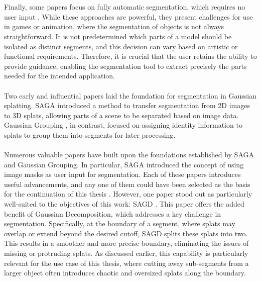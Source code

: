 \documentclass[12pt]{article}
\begin{document}
\\\\
Finally, some papers focus on fully automatic segmentation, which requires no user input \cite{automatic}. While these approaches are powerful, they present challenges for use in games or animation, where the segmentation of objects is not always straightforward. It is not predetermined which parts of a model should be isolated as distinct segments, and this decision can vary based on artistic or functional requirements. Therefore, it is crucial that the user retains the ability to provide guidance, enabling the segmentation tool to extract precisely the parts needed for the intended application.
\\\\
Two early and influential papers laid the foundation for segmentation in Gaussian splatting. SAGA \cite{saga} introduced a method to transfer segmentation from 2D images to 3D splats, allowing parts of a scene to be separated based on image data. Gaussian Grouping \cite{grouping}, in contrast, focused on assigning identity information to splats to group them into segments for later processing.
\\\\
Numerous valuable papers have built upon the foundations established by SAGA and Gaussian Grouping. In particular, SAGA introduced the concept of using image masks as user input for segmentation. Each of these papers introduces useful advancements, and any one of them could have been selected as the basis for the continuation of this thesis \cite{other1,other2,other3,other4}. However, one paper stood out as particularly well-suited to the objectives of this work: SAGD \cite{SAGD}. This paper offers the added benefit of Gaussian Decomposition, which addresses a key challenge in segmentation. Specifically, at the boundary of a segment, where splats may overlap or extend beyond the desired cutoff, SAGD splits these splats into two. This results in a smoother and more precise boundary, eliminating the issues of missing or protruding splats. As discussed earlier, this capability is particularly relevant for the use case of this thesis, where cutting away sub-segments from a larger object often introduces chaotic and oversized splats along the boundary.
\end{document}
